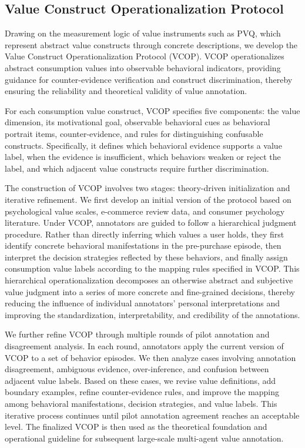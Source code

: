 \documentclass[11pt]{article}
\begin{document}
\subsection{Value Construct Operationalization Protocol}
Drawing on the measurement logic of value instruments such as PVQ, which represent abstract value constructs through concrete descriptions, we develop the Value Construct Operationalization Protocol (VCOP). VCOP operationalizes abstract consumption values into observable behavioral indicators, providing guidance for counter-evidence verification and construct discrimination, thereby ensuring the reliability and theoretical validity of value annotation.

For each consumption value construct, VCOP specifies five components: the value dimension, its motivational goal, observable behavioral cues as behavioral portrait items, counter-evidence, and rules for distinguishing confusable constructs. Specifically, it defines which behavioral evidence supports a value label, when the evidence is insufficient, which behaviors weaken or reject the label, and which adjacent value constructs require further discrimination.

The construction of VCOP involves two stages: theory-driven initialization and iterative refinement. We first develop an initial version of the protocol based on psychological value scales, e-commerce review data, and consumer psychology literature. Under VCOP, annotators are guided to follow a hierarchical judgment procedure. Rather than directly inferring which values a user holds, they first identify concrete behavioral manifestations in the pre-purchase episode, then interpret the decision strategies reflected by these behaviors, and finally assign consumption value labels according to the mapping rules specified in VCOP. This hierarchical operationalization decomposes an otherwise abstract and subjective value judgment into a series of more concrete and fine-grained decisions, thereby reducing the influence of individual annotators’ personal interpretations and improving the standardization, interpretability, and credibility of the annotations.

We further refine VCOP through multiple rounds of pilot annotation and disagreement analysis. In each round, annotators apply the current version of VCOP to a set of behavior episodes. We then analyze cases involving annotation disagreement, ambiguous evidence, over-inference, and confusion between adjacent value labels. Based on these cases, we revise value definitions, add boundary examples, refine counter-evidence rules, and improve the mapping among behavioral manifestations, decision strategies, and value labels. This iterative process continues until pilot annotation agreement reaches an acceptable level. The finalized VCOP is then used as the theoretical foundation and operational guideline for subsequent large-scale multi-agent value annotation.
\end{document}
